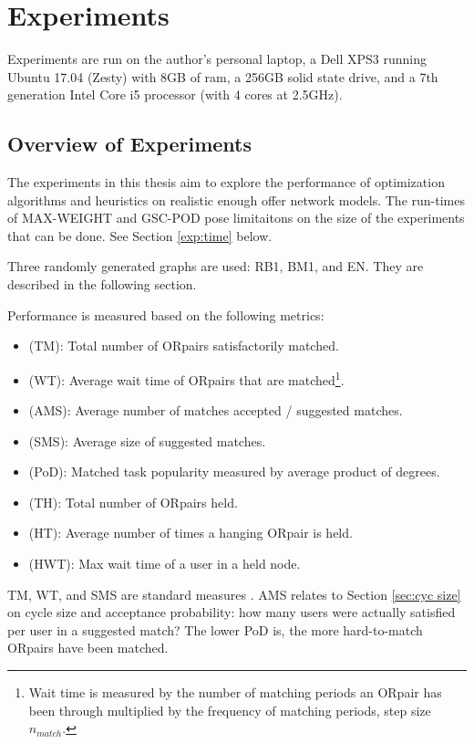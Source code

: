\documentclass[main.tex]{subfiles}
\begin{document}
\section{Experiments}

Experiments are run on the author's personal laptop, a Dell XPS3 running Ubuntu 17.04 (Zesty) with 8GB of ram, a 256GB solid state drive, and a 7th generation Intel Core i5 processor (with 4 cores at 2.5GHz).

\subsection{Overview of Experiments}
The experiments in this thesis aim to explore the performance of optimization algorithms and heuristics on realistic enough offer network models. The run-times of MAX-WEIGHT and GSC-POD pose limitaitons on the size of the experiments that can be done. See Section \ref{exp:time} below.

Three randomly generated graphs are used: RB1, BM1, and EN. They are described in the following section.

Performance is measured based on the following metrics:

\begin{itemize}
  \item (TM): Total number of ORpairs satisfactorily matched.
  \item (WT): Average wait time of ORpairs that are matched\footnote{Wait time is measured by the number of matching periods an ORpair has been through multiplied by the frequency of matching periods, step size $n_{match}$.}.
  \item (AMS): Average number of matches accepted / suggested matches.
  \item (SMS): Average size of suggested matches.
  \item (PoD): Matched task popularity measured by average product of degrees.
  \item (TH): Total number of ORpairs held.
  \item (HT): Average number of times a hanging ORpair is held.
  \item (HWT): Max wait time of a user in a held node.
\end{itemize}


TM, WT, and SMS are standard measures \cite{Dick} \cite{And1} \cite{Abb1}. AMS relates to Section \ref{sec:cyc size} on cycle size and acceptance probability: how many users were actually satisfied per user in a suggested match? The lower PoD is, the more hard-to-match ORpairs have been matched.
\end{document}
